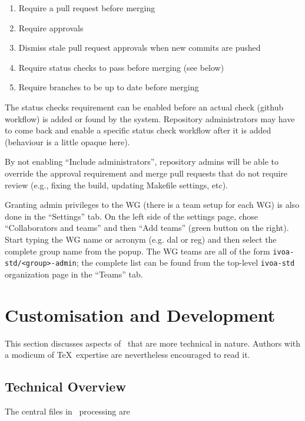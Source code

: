 \documentclass[11pt,a4paper]{ivoa}
\begin{document}
\begin{enumerate}
\item Require a pull request before merging
\item Require approvals
\item Dismiss stale pull request approvals when new commits are pushed
\item Require status checks to pass before merging (see below)
\item Require branches to be up to date before merging
\end{enumerate}

The status checks requirement can be enabled before an actual check (github workflow) is
added or found by the system. Repository administrators may have to come back and enable a 
specific status check workflow after it is added (behaviour is a little opaque here).

By not enabling ``Include administrators'', repository admins will be able to override the 
approval requirement and merge pull requests that do not require review (e.g., fixing the build,
updating Makefile settings, etc).

Granting admin privileges to the WG (there is a team setup for each WG) is also done in the 
``Settings'' tab. On the left side of the settings page, chose ``Collaborators and teams''
and then ``Add teams'' (green button on the right). Start typing the WG name or acronym (e.g.
dal or reg) and then select the complete group name from the popup. The WG teams are all
of the form \verb|ivoa-std/<group>-admin|; the complete list can be found from the top-level 
\verb|ivoa-std| organization page in the ``Teams'' tab.

\section{Customisation and Development}
\label{sect:impl}

This section discusses aspects of \ivoatex\ that are more technical in
nature.  Authors with a modicum of \TeX\ expertise are nevertheless
encouraged to read it.

\subsection{Technical Overview}

The central files in \ivoatex\ processing are
\end{document}

